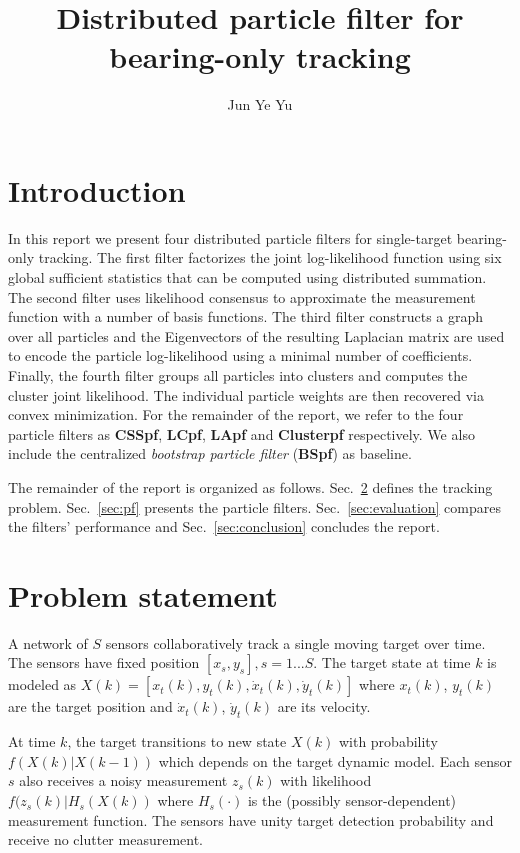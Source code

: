 \documentclass[10pt,letterpaper,final]{article}
\author{Jun Ye Yu}
\title{Distributed particle filter for bearing-only tracking}
\begin{document}
\maketitle

\section{Introduction}
In this report we present four distributed particle filters for single-target bearing-only tracking. The first filter factorizes the joint log-likelihood function using six global sufficient statistics that can be computed using distributed summation. The second filter uses likelihood consensus to approximate the measurement function with a number of basis functions. The third filter constructs a graph over all particles and the Eigenvectors of the resulting Laplacian matrix are used to encode the particle log-likelihood using a minimal number of coefficients. Finally, the fourth filter groups all particles into clusters and computes the cluster joint likelihood. The individual particle weights are then recovered via convex minimization. For the remainder of the report, we refer to the four particle filters as \textbf{CSSpf}, \textbf{LCpf}, \textbf{LApf} and \textbf{Clusterpf} respectively. We also include the centralized \textit{bootstrap particle filter} (\textbf{BSpf}) as baseline. 

The remainder of the report is organized as follows. Sec.~\ref{sec:problem} defines the tracking problem. Sec.~\ref{sec:pf} presents the particle filters. Sec.~\ref{sec:evaluation} compares the filters' performance and Sec.~\ref{sec:conclusion} concludes the report. 

\section{Problem statement}
\label{sec:problem}
A network of $S$ sensors collaboratively track a single moving target over time. The sensors have fixed position $[x_s, y_s], s=1...S$. The target state at time $k$ is modeled as $X(k) = [x_t(k),y_t(k), \dot{x}_t(k), \dot{y}_t(k)]$ where $x_t(k)$, $y_t(k)$ are the target position and $\dot{x}_t(k)$, $\dot{y}_t(k)$ are its velocity. 

At time $k$, the target transitions to new state $X(k)$ with probability $f(X(k)|X(k-1))$ which depends on the target dynamic model. Each sensor $s$ also receives a noisy measurement $z_s(k)$ with likelihood $f(z_s(k)|H_s(X(k))$ where $H_s(\cdot)$ is the (possibly sensor-dependent) measurement function. The sensors have unity target detection probability and receive no clutter measurement. 
\end{document}
